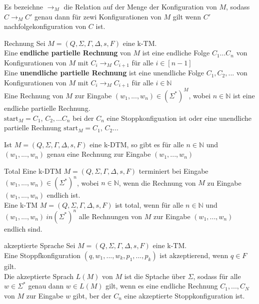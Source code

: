 
Es bezeichne $\rightarrow_M$ die Relation auf der Menge der Konfiguration von $M$, 
sodass $C \rightarrow_M C'$ genau dann für zewi Konfigurationen von $M$ gilt wenn $C'$ nachfolgekonfiguration von $C$ ist. 

\begin{defn}{Rechnung}
    Sei $M = (Q, \Sigma, \Gamma, \Delta, s, F)$ eine k-TM. \\
    
    Eine \textbf{endliche partielle Rechnung} von $M$ ist eine endliche Folge
    $C_1...C_n$ von Konfigurationen von $M$ mit $C_i \rightarrow_M C_{i+1}$ für alle $i \in [n-1]$ \\

    Eine \textbf{unendliche partielle Rechnung} ist eine unendliche Folge $C_1,C_2,...$ von Konfigurationen von $M$
    mit $C_i \rightarrow_M C_{i+1}$ für alle $i \in \mathbb{N}$ \\

    Eine Rechnung von $M$ zur Eingabe $(w_1,...,w_n) \in (\Sigma^*)^M$, wobei $n \in \mathbb{N}$ ist eine endliche partielle Rechnung. \\
    $\text{start}_M = C_1$, $C_2,...C_n$ bei der $C_n$ eine Stoppkonfiguation ist oder eine unendliche partielle Rechnung $\text{start}_M = C_1$, $C_2...$ 
\end{defn}

\begin{bem}
    Ist $M = (Q, \Sigma, \Gamma, \Delta, s, F)$ eine k-DTM, so gibt es für alle $n \in \mathbb{N}$ und $(w_1,...,w_n)$
    genau eine Rechnung zur Eingabe $(w_1,...,w_n)$
\end{bem}

\begin{defn}{Total}
    Eine k-DTM $M = (Q, \Sigma, \Gamma, \Delta, s, F)$ terminiert bei Eingabe $(w_1,...,w_n) \in (\Sigma^*)^n$,
    wobei $n \in \mathbb{N}$, wenn die Rechnung von $M$ zu Eingabe $(w_1,...,w_n)$ endlich ist. \\

    Eine k-TM $M = (Q, \Sigma, \Gamma, \Delta, s, F)$ ist total,  wenn für alle $n \in \mathbb{N}$ und 
    $(w_1,...,w_n) \ in (\Sigma^*)^n$ alle Rechnungen von $M$ zur Eingabe $(w_1,...,w_n)$ endlich sind.
\end{defn}

\begin{defn}{akzeptierte Sprache}
    Sei $M = (Q, \Sigma, \Gamma, \Delta, s, F)$ eine k-TM. \\
    Eine Stoppfkonfiguration $(q,w_1,...,w_k,p_1,...,p_k)$ ist akzeptierend, wenn $q \in F$ gilt. \\

    Die akzeptierte Sprach $L(M)$ von $M$ ist die Sptache über $\Sigma$, sodass für alle $w \in \Sigma^*$ genau dann $w \in L(M)$ gilt,
    wenn es eine endliche Rechnung $C_1,...,C_N$ von $M$ zur Eingabe $w$ gibt, ber der $C_n$ eine akzeptierte Stoppkonfiguration ist.
\end{defn}

